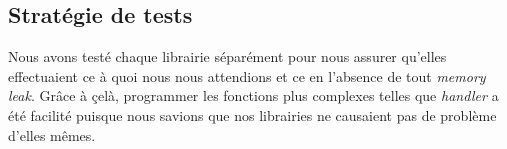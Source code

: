 \documentclass[../main.tex]{subfiles}
\begin{document}
\subsection{Stratégie de tests}
\label{sec:tests}

Nous avons testé chaque librairie séparément pour nous assurer qu'elles effectuaient ce à quoi nous nous attendions et ce en l'absence de tout \textit{memory leak}.
Grâce à çelà, programmer les fonctions plus complexes telles que \textit{handler} a été facilité puisque nous savions que nos librairies ne causaient pas de 
problème d'elles mêmes.
\end{document}
